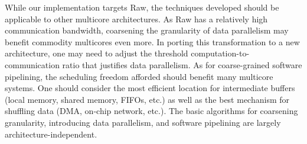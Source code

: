 While our implementation targets Raw, the techniques developed should
be applicable to other multicore architectures.  As Raw has a
relatively high communication bandwidth, coarsening the granularity of
data parallelism may benefit commodity multicores even more.  In
porting this transformation to a new architecture, one may need to
adjust the threshold computation-to-communication ratio that justifies
data parallelism.  As for coarse-grained software pipelining, the
scheduling freedom afforded should benefit many multicore systems.
One should consider the most efficient location for intermediate
buffers (local memory, shared memory, FIFOs, etc.) as well as the best
mechanism for shuffling data (DMA, on-chip network, etc.).  The basic
algorithms for coarsening granularity, introducing data parallelism,
and software pipelining are largely architecture-independent.






